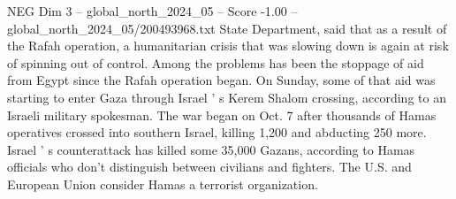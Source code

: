\begin{textsample}{NEG Dim 3 – global\_north\_2024\_05 – Score -1.00 – global\_north\_2024\_05/200493968.txt}
State Department, said that as a result of the Rafah operation, a humanitarian crisis that was slowing down is again at risk of spinning out of control.
Among the problems has been the stoppage of aid from Egypt since the Rafah operation began.
On Sunday, some of that aid was starting to enter Gaza through Israel ' s Kerem Shalom crossing, according to an Israeli military spokesman.
The war began on Oct. 7 after thousands of Hamas operatives crossed into southern Israel, killing 1,200 and abducting 250 more.
Israel ' s counterattack has killed some 35,000 Gazans, according to Hamas officials who don't distinguish between civilians and fighters.
The U.S. and European Union consider Hamas a terrorist organization.

\end{textsample}
